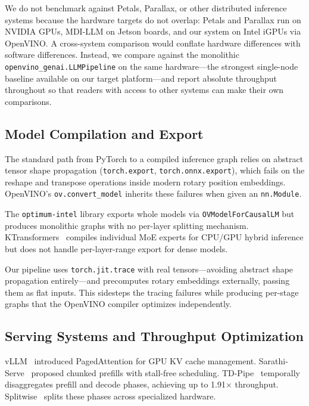 \documentclass[11pt]{article}
\newcommand{\brk}{\discretionary{}{}{}}
\begin{document}
We do not benchmark against Petals, Parallax, or other distributed inference systems because the hardware targets do not overlap: Petals and Parallax run on NVIDIA GPUs, MDI-LLM on Jetson boards, and our system on Intel iGPUs via OpenVINO. A cross-system comparison would conflate hardware differences with software differences. Instead, we compare against the monolithic \texttt{openvino\_genai.LLMPipeline} on the same hardware---the strongest single-node baseline available on our target platform---and report absolute throughput throughout so that readers with access to other systems can make their own comparisons.

\subsection{Model Compilation and Export}

The standard path from PyTorch to a compiled inference graph relies on abstract tensor shape propagation (\texttt{torch.export}, \texttt{torch.\brk onnx.\brk export}), which fails on the reshape and transpose operations inside modern rotary position embeddings. OpenVINO's \texttt{ov.\brk convert\_model} inherits these failures when given an \texttt{nn.Module}.

The \texttt{optimum-\brk intel} library exports whole models via \texttt{OVModelForCausalLM} but produces monolithic graphs with no per-layer splitting mechanism. KTransformers~\cite{chen2025ktransformers} compiles individual MoE experts for CPU/GPU hybrid inference but does not handle per-layer-range export for dense models.

Our pipeline uses \texttt{torch.\brk jit.\brk trace} with real tensors---avoiding abstract shape propagation entirely---and precomputes rotary embeddings externally, passing them as flat inputs. This sidesteps the tracing failures while producing per-stage graphs that the OpenVINO compiler optimizes independently.

\subsection{Serving Systems and Throughput Optimization}

vLLM~\cite{kwon2023vllm} introduced PagedAttention for GPU KV cache management. Sarathi-Serve~\cite{agrawal2024sarathi} proposed chunked prefills with stall-free scheduling. TD-Pipe~\cite{zhang2025tdpipe} temporally disaggregates prefill and decode phases, achieving up to 1.91$\times$ throughput. Splitwise~\cite{patel2024splitwise} splits these phases across specialized hardware.
\end{document}
